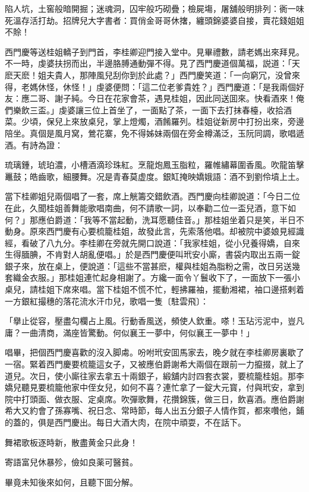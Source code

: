 \begin{myquote}
陷人坑，土窖般暗開掘；迷魂洞，囚牢般巧砌疊；檢屍塲，屠舖般明排列：衠一味死溫存活打劫。招牌兒大字書者：買俏金哥哥休撦，纏頭錦婆婆自接，賣花錢姐姐不賒！
\end{myquote}

西門慶等送桂姐轎子到門首，李桂卿迎門接入堂中。見畢禮數，請老媽出來拜見。不一時，虔婆扶拐而出，半邊胳膊通動彈不得。見了西門慶道個萬福，説道：「天麽天麽！姐夫貴人，那陣風兒刮你到於此處？」西門慶笑道：「一向窮冗，没曾來得，老媽休怪，休怪！」虔婆便問：「這二位老爹貴姓？」西門慶道：「是我兩個好友：應二哥、謝子純。今日在花家會茶，遇見桂姐，因此同送囬來。快看酒來！俺們樂飲三盃。」虔婆讓三位上首坐了，一面點了茶，一面下去打抹春檯，收拾酒菜。少頃，保兒上來放桌兒，掌上燈燭，酒餚羅列。桂姐従新房中打扮出來，旁邊陪坐。真個是風月窝，鶯花寨，免不得姊妹兩個在旁金樽滿泛，玉阮同調，歌唱遞酒。有詩為證：

\begin{myquote}
琉璃鍾，琥珀濃，小槽酒滴珍珠紅。烹龍炮鳳玉脂粒，羅帷繡幕圍香風。吹龍笛擊鼉鼓；皓齒歌，細腰舞。况是青春莫虚度。銀缸掩映嬌娥語：酒不到劉伶墳上土。
\end{myquote}

當下桂卿姐兒兩個唱了一套，席上觥籌交錯飲酒。西門慶向桂卿說道：「今日二位在此，久聞桂姐善舞能歌唱南曲，何不請歌一詞，以奉勸二位一盃兒酒，意下如何？」那應伯爵道：「我等不當起動，洗耳愿聽佳音。」那桂姐坐着只是笑，半日不動身。原來西門慶有心要梳籠桂姐，故發此言，先索落他唱。却被院中婆娘見經識經，看破了八九分。李桂卿在旁就先開口說道：「我家桂姐，從小兒養得嬌，自來生得腼腆，不肯對人胡亂便唱。」於是西門慶便叫玳安小廝，書袋内取出五兩一錠銀子來，放在桌上，便說道：「這些不當甚麽，權與桂姐為脂粉之需，改日另送幾套織金衣服。」那桂姐連忙起身相謝了。方纔一面令丫鬟收下了，一面放下一張小桌兒，請桂姐下席來唱。當下桂姐不慌不忙，輕拂羅袖，擺動湘裙，袖口邊搭剌着一方銀紅撮穗的落花流水汗巾兒，歌唱一隻〔駐雲飛〕：

\begin{myquote}
「擧止從容，壓盡勾欄占上風。行動香風送，頻使人欽重。嗏！玉玷污泥中，豈凡庸？一曲清商，滿座皆驚動。何似襄王一夢中，何似襄王一夢中！」
\end{myquote}

唱畢，把個西門慶喜歡的沒入脚䖏。吩咐玳安囬馬家去，晚夕就在李桂卿房裏歇了一宿。緊着西門慶要梳籠這女子，又被應伯爵謝希大兩個在跟前一力攛掇，就上了道兒。次日，使小廝往家去拿五十兩銀子，緞舖内討四套衣裳，要梳籠桂姐。那李嬌兒聽見要梳籠他家中侄女兒，如何不喜？連忙拿了一錠大元寳，付與玳安，拿到院中打頭面、做衣服、定桌席。吹彈歌舞，花攢錦簇，做三日，飲喜酒。應伯爵謝希大又約會了孫寡嘴、祝日念、常時節，每人出五分銀子人情作賀，都來囋他，鋪的蓋的，俱是西門慶出。每日大酒大肉，在院中頑耍，不在話下。

\begin{myquote}
舞裙歌板逐時新，散盡黄金只此身！

寄語富兒休暴殄，儉如良薬可醫貧。
\end{myquote}

畢竟未知後來如何，且聽下囬分解。

